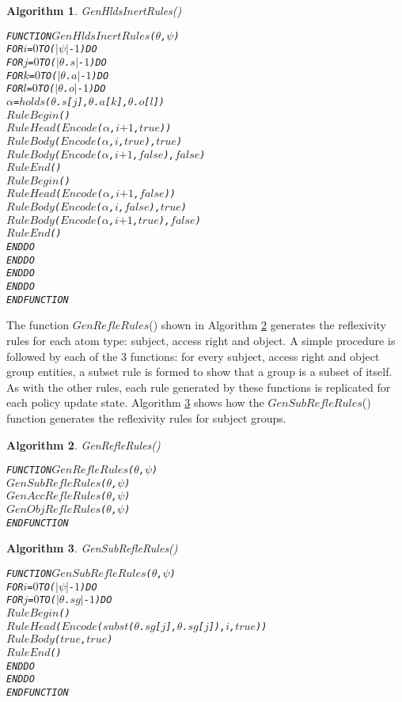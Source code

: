 \documentclass[11pt]{report}
\newenvironment{vverbatim}
{
  \begin{alltt}
}
{
    \vspace{-\baselineskip}
  \end{alltt}
}
\newtheorem{vvalgorithm}{Algorithm}[chapter]
\newenvironment{valgorithm}[2]
{
  \begin{vvalgorithm}{#1}
    \label{#2}
    \small
    \begin{vverbatim}
}
{
    \end{vverbatim}
  \end{vvalgorithm}
}
\begin{document}
          \begin{valgorithm}{GenHldsInertRules()}{algo-polup-ghinr}
FUNCTION \(GenHldsInertRules\)(\(\theta\), \(\psi\))
  FOR \(i\) = \(0\) TO (\(|\psi|\) - \(1\)) DO
    FOR \(j\) = \(0\) TO (\(|\)\(\theta\).\(s\)\(|\) - \(1\)) DO
      FOR \(k\) = \(0\) TO (\(|\)\(\theta\).\(a\)\(|\) - \(1\)) DO
        FOR \(l\) = \(0\) TO (\(|\)\(\theta\).\(o\)\(|\) - \(1\)) DO
          \(\alpha\) = \(holds\)(\(\theta\).\(s\)[\(j\)], \(\theta\).\(a\)[\(k\)], \(\theta\).\(o\)[\(l\)])
          \(RuleBegin\)()
          \(RuleHead\)(\(Encode\)(\(\alpha\), \(i\) \(+\) \(1\), \(true\)))
          \(RuleBody\)(\(Encode\)(\(\alpha\), \(i\), \(true\)), \(true\))
          \(RuleBody\)(\(Encode\)(\(\alpha\), \(i\) \(+\) \(1\), \(false\)), \(false\))
          \(RuleEnd\)()
          \(RuleBegin\)()
          \(RuleHead\)(\(Encode\)(\(\alpha\), \(i\) \(+\) \(1\), \(false\)))
          \(RuleBody\)(\(Encode\)(\(\alpha\), \(i\), \(false\)), \(true\))
          \(RuleBody\)(\(Encode\)(\(\alpha\), \(i\) \(+\) \(1\), \(true\)), \(false\))
          \(RuleEnd\)()
        ENDDO
      ENDDO
    ENDDO
  ENDDO
ENDFUNCTION
          \end{valgorithm}

          The function $GenRefleRules$() shown in Algorithm
          \ref{algo-polup-grefr} generates the reflexivity rules for each atom
          type: subject, access right and object. A simple procedure is
          followed by each of the 3 functions: for every subject, access right
          and object group entities, a subset rule is formed to
          show that a group is a subset of itself. As with the other rules,
          each rule generated by these functions is replicated for each policy
          update state. Algorithm \ref{algo-polup-gsrer} shows how the
          $GenSubRefleRules$() function generates the reflexivity rules for
          subject groups.

          \begin{valgorithm}{GenRefleRules()}{algo-polup-grefr}
FUNCTION \(GenRefleRules\)(\(\theta\), \(\psi\))
  \(GenSubRefleRules\)(\(\theta\), \(\psi\))
  \(GenAccRefleRules\)(\(\theta\), \(\psi\))
  \(GenObjRefleRules\)(\(\theta\), \(\psi\))
ENDFUNCTION
          \end{valgorithm}

          \begin{valgorithm}{GenSubRefleRules()}{algo-polup-gsrer}
FUNCTION \(GenSubRefleRules\)(\(\theta\), \(\psi\))
  FOR \(i\) = \(0\) TO (\(|\psi|\) - \(1\)) DO
    FOR \(j\) = \(0\) TO (\(|\)\(\theta\).\(sg\)\(|\) - \(1\)) DO
      \(RuleBegin\)()
      \(RuleHead\)(\(Encode\)(\(subst\)(\(\theta\).\(sg\)[\(j\)], \(\theta\).\(sg\)[\(j\)]), \(i\), \(true\)))
      \(RuleBody\)(\(true\), \(true\))
      \(RuleEnd\)()
    ENDDO
  ENDDO
ENDFUNCTION
          \end{valgorithm}
\end{document}
